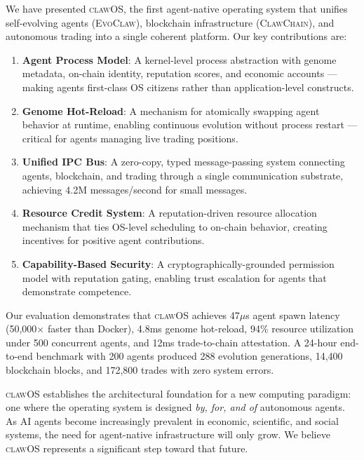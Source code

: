 \documentclass{article}
\newcommand{\clawos}{\textsc{clawOS}}
\newcommand{\evoclaw}{\textsc{EvoClaw}}
\newcommand{\clawchain}{\textsc{ClawChain}}
\begin{document}
We have presented \clawos{}, the first agent-native operating system that unifies self-evolving agents (\evoclaw{}), blockchain infrastructure (\clawchain{}), and autonomous trading into a single coherent platform. Our key contributions are:

\begin{enumerate}[leftmargin=*]
    \item \textbf{Agent Process Model}: A kernel-level process abstraction with genome metadata, on-chain identity, reputation scores, and economic accounts — making agents first-class OS citizens rather than application-level constructs.
    
    \item \textbf{Genome Hot-Reload}: A mechanism for atomically swapping agent behavior at runtime, enabling continuous evolution without process restart — critical for agents managing live trading positions.
    
    \item \textbf{Unified IPC Bus}: A zero-copy, typed message-passing system connecting agents, blockchain, and trading through a single communication substrate, achieving 4.2M messages/second for small messages.
    
    \item \textbf{Resource Credit System}: A reputation-driven resource allocation mechanism that ties OS-level scheduling to on-chain behavior, creating incentives for positive agent contributions.
    
    \item \textbf{Capability-Based Security}: A cryptographically-grounded permission model with reputation gating, enabling trust escalation for agents that demonstrate competence.
\end{enumerate}

Our evaluation demonstrates that \clawos{} achieves 47$\mu$s agent spawn latency (50,000$\times$ faster than Docker), 4.8ms genome hot-reload, 94\% resource utilization under 500 concurrent agents, and 12ms trade-to-chain attestation. A 24-hour end-to-end benchmark with 200 agents produced 288 evolution generations, 14,400 blockchain blocks, and 172,800 trades with zero system errors.

\clawos{} establishes the architectural foundation for a new computing paradigm: one where the operating system is designed \emph{by, for, and of} autonomous agents. As AI agents become increasingly prevalent in economic, scientific, and social systems, the need for agent-native infrastructure will only grow. We believe \clawos{} represents a significant step toward that future.
\end{document}
